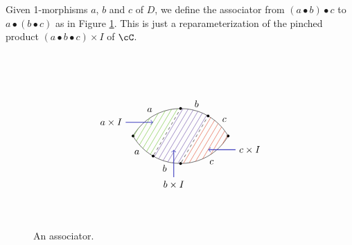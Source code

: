 Given 1-morphisms $a$, $b$ and $c$ of $D$, we define the associator from $(a\bullet b)\bullet c$ to $a\bullet(b\bullet c)$
as in Figure \ref{fig:associator}.
This is just a reparameterization of the pinched product $(a\bullet b\bullet c)\times I$ of $\cC$.
\begin{figure}[t]
$$
\begin{tikzpicture}
\node[circle,fill=black,inner sep=1pt] at (1.73,0) {};
\node[circle,fill=black,inner sep=1pt] at (-1.73,0) {};
\begin{scope}[yshift=-1cm]
\path[clip] (0,0) circle (2);
\begin{scope}[yshift=2cm]
\draw (0,0) circle (2);
\node[circle,fill=black,inner sep=1pt] (L2) at (-90:2) {};
\node[circle,fill=black,inner sep=1pt] (L1) at (-120:2) {};
\node at (-60:2.25) {$c$};
\node at (-105:2.25) {$b$};
\node at (-135:2.25) {$a$};
\end{scope}
\end{scope}
\begin{scope}[yshift=1cm]
\path[clip] (0,0) circle (2);
\begin{scope}[yshift=-2cm]
\node at (120:2.25) {$a$};
\node at (75:2.25) {$b$};
\node at (45:2.25) {$c$};
\draw (0,0) circle (2);
\node[circle,fill=black,inner sep=1pt] (U1) at (90:2) {};
\node[circle,fill=black,inner sep=1pt] (U2) at (60:2) {};
\end{scope}
\end{scope}
\draw[dashed] (L1) -- (U1);
\draw[dashed] (L2) -- (U2);
\begin{scope}
\path[clip] (0,1) circle (2);
\path[clip] (0,-1) circle (2);
		\foreach \t in {-2.5,-2.3,...,-1.2} {
			\draw[green!50!brown] (\t,-1) -- +(1.19,2);
		}
		\foreach \t in {-1.1,-0.9,...,0} {
			\draw[blue!50!brown] (\t,-1) -- +(1.19,2);
		}
		\foreach \t in {0.1,0.3,...,2.5} {
			\draw[red!50!brown] (\t,-1) -- +(1.19,2);
		}
\end{scope}
\draw[->, thick, blue!75!yellow] (-2,0.5) node[black, left] {$a\times I$} -- (-1,0.5);
\draw[->, thick, blue!75!yellow] (-0.25,-1.5) node[black, below] {$b\times I$} -- (-0.25,-0.5);
\draw[->, thick, blue!75!yellow] (2,-0.5) node[black, right] {$c\times I$} -- (1,-0.5);
\end{tikzpicture}
$$
\caption{An associator.}
\label{fig:associator}
\end{figure}


